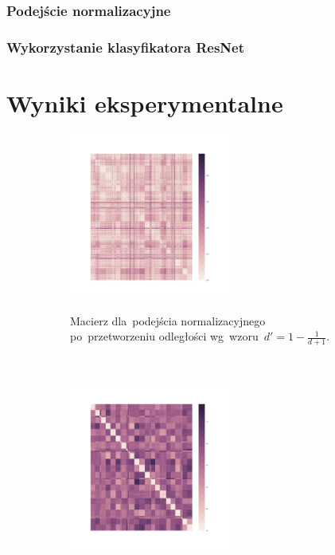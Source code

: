 \documentclass[11pt,a4paper]{article}
\begin{document}
\subsubsection{Podejście normalizacyjne}

\subsubsection{Wykorzystanie klasyfikatora ResNet}

\section{Wyniki eksperymentalne}
\label{sec:results}

\begin{figure}[H]
    \begin{subfigure}{\textwidth}
        \centering
        \includegraphics[width=0.6\textwidth]{res/img/normalized_distance_matrix.png}
        \label{subfig:normalized-distance-matrix}
        \caption{Macierz dla~podejścia normalizacyjnego po~przetworzeniu odległości wg~wzoru~$d' = 1 - \frac{1}{d + 1}$.}
    \end{subfigure}
    \\
    \begin{subfigure}{\textwidth}
        \centering
        \includegraphics[width=0.6\textwidth]{res/img/resnet_distance_matrix.png}

\end{subfigure}
\end{figure}
\end{document}
